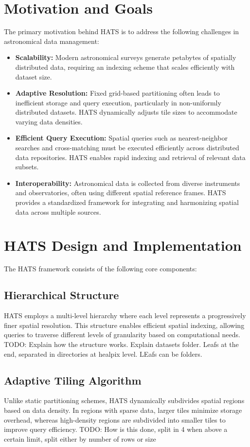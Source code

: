 \documentclass[11pt,a4paper]{ivoa}
\begin{document}
\section{Motivation and Goals}
    The primary motivation behind HATS is to address the following challenges in astronomical data management:
    \begin{itemize}
        \item \textbf{Scalability:} Modern astronomical surveys generate petabytes of spatially distributed data, requiring an indexing scheme that scales efficiently with dataset size.
        \item \textbf{Adaptive Resolution:} Fixed grid-based partitioning often leads to inefficient storage and query execution, particularly in non-uniformly distributed datasets. HATS dynamically adjusts tile sizes to accommodate varying data densities.
        \item \textbf{Efficient Query Execution:} Spatial queries such as nearest-neighbor searches and cross-matching must be executed efficiently across distributed data repositories. HATS enables rapid indexing and retrieval of relevant data subsets.
        \item \textbf{Interoperability:} Astronomical data is collected from diverse instruments and observatories, often using different spatial reference frames. HATS provides a standardized framework for integrating and harmonizing spatial data across multiple sources.
    \end{itemize}

\section{HATS Design and Implementation}
    The HATS framework consists of the following core components:
    \subsection{Hierarchical Structure}
    HATS employs a multi-level hierarchy where each level represents a progressively finer spatial resolution. This structure enables efficient spatial indexing, allowing queries to traverse different levels of granularity based on computational needs.
    TODO: Explain how the structure works. Explain datasets folder. Leafs at the end, separated in directories at healpix level. LEafs can be folders.

    \subsection{Adaptive Tiling Algorithm}
    Unlike static partitioning schemes, HATS dynamically subdivides spatial regions based on data density. In regions with sparse data, larger tiles minimize storage overhead, whereas high-density regions are subdivided into smaller tiles to improve query efficiency.    TODO: How is this done, split in 4 when above a certain limit, split either by number of rows or size 
\end{document}
